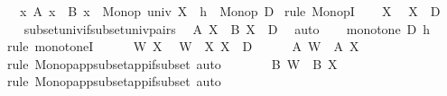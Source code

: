 \begin{isabellebody}
\ \ \ {\isachardoublequoteopen}{\isacharparenleft}{\kern0pt}{\isasymlambda}x{\isachardot}{\kern0pt}\ A\ x\ {\isasymtimes}\ B\ x{\isacharparenright}{\kern0pt}\ {\isacharcolon}{\kern0pt}\ Monop\ {\isacharparenleft}{\kern0pt}univ\ X{\isacharparenright}{\kern0pt}{\isachardoublequoteclose}\ {\isacharparenleft}{\kern0pt}\ {\isachardoublequoteopen}{\isacharquery}{\kern0pt}h\ {\isacharcolon}{\kern0pt}\ Monop\ {\isacharquery}{\kern0pt}D{\isachardoublequoteclose}{\isacharparenright}{\kern0pt}\isanewline
%
\isadelimproof
%
\endisadelimproof
%
\isatagproof
{}\isamarkupfalse%
\ {\isacharparenleft}{\kern0pt}rule\ MonopI{\isacharparenright}{\kern0pt}\isanewline
\ \ \isamarkupfalse%
\ X\ \isamarkupfalse%
\ {\isachardoublequoteopen}X\ {\isasymsubseteq}\ {\isacharquery}{\kern0pt}D{\isachardoublequoteclose}\isanewline
\ \ \isamarkupfalse%
\ subset{\isacharunderscore}{\kern0pt}univ{\isacharunderscore}{\kern0pt}if{\isacharunderscore}{\kern0pt}subset{\isacharunderscore}{\kern0pt}univ{\isacharunderscore}{\kern0pt}pairs\ \isamarkupfalse%
\ {\isachardoublequoteopen}A\ X\ {\isasymtimes}\ B\ X\ {\isasymsubseteq}\ {\isacharquery}{\kern0pt}D{\isachardoublequoteclose}\ \isamarkupfalse%
\ auto\isanewline
{}\isamarkupfalse%
\isanewline
\ \ \isamarkupfalse%
\ {\isachardoublequoteopen}monotone\ {\isacharquery}{\kern0pt}D\ {\isacharquery}{\kern0pt}h{\isachardoublequoteclose}\isanewline
\ \ \isamarkupfalse%
\ {\isacharparenleft}{\kern0pt}rule\ monotoneI{\isacharparenright}{\kern0pt}\isanewline
\ \ \ \ \isamarkupfalse%
\ W\ X\ \isamarkupfalse%
\ {\isachardoublequoteopen}W\ {\isasymsubseteq}\ X{\isachardoublequoteclose}\ {\isachardoublequoteopen}X\ {\isasymsubseteq}\ {\isacharquery}{\kern0pt}D{\isachardoublequoteclose}\isanewline
\ \ \ \ \isamarkupfalse%
\ {\isachardoublequoteopen}A\ W\ {\isasymsubseteq}\ A\ X{\isachardoublequoteclose}\ \isamarkupfalse%
\ {\isacharparenleft}{\kern0pt}rule\ Monop{\isacharunderscore}{\kern0pt}app{\isacharunderscore}{\kern0pt}subset{\isacharunderscore}{\kern0pt}app{\isacharunderscore}{\kern0pt}if{\isacharunderscore}{\kern0pt}subset{\isacharparenright}{\kern0pt}\ auto\isanewline
\ \ \ \ \isamarkupfalse%
\ \isamarkupfalse%
\ {\isachardoublequoteopen}B\ W\ {\isasymsubseteq}\ B\ X{\isachardoublequoteclose}\ \isamarkupfalse%
\ {\isacharparenleft}{\kern0pt}rule\ Monop{\isacharunderscore}{\kern0pt}app{\isacharunderscore}{\kern0pt}subset{\isacharunderscore}{\kern0pt}app{\isacharunderscore}{\kern0pt}if{\isacharunderscore}{\kern0pt}subset{\isacharparenright}{\kern0pt}\ auto\isanewline

\end{isabellebody}
